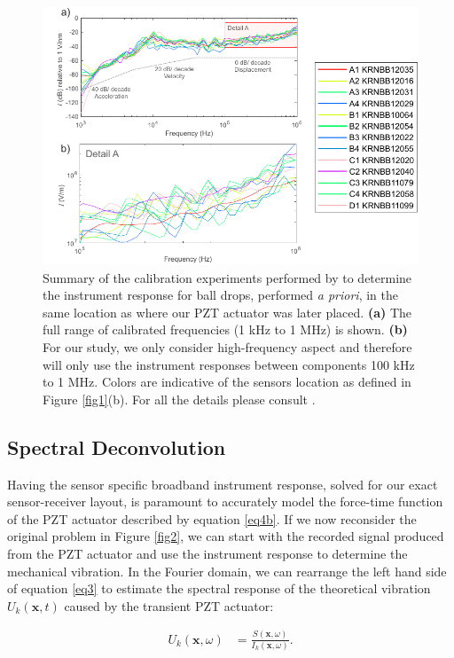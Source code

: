 \documentclass[preprint,3p, 11pt,authoryear]{elsarticle}
\begin{document}
\begin{figure}[ht]
     	\centering
\includegraphics[scale= 1.0]{FIG6.pdf} 
\caption{Summary of the calibration experiments performed by \citet{Wu} to determine the instrument response for ball drops, performed \textit{a priori}, in the same location as where our PZT actuator was later placed. \textbf{(a)} The full range of calibrated frequencies (1 kHz to 1 MHz) is shown. \textbf{(b)} For our study, we only consider high-frequency aspect and therefore will only use the instrument responses between components 100 kHz to 1 MHz.  Colors are indicative of the sensors location as defined in Figure \ref{fig1}(b). For all the details please consult \citet{Wu}. }
	\label{fig6} 
\end{figure}

\subsection{Spectral Deconvolution}
\label{Spec_deconv}
Having the sensor specific broadband instrument response, solved for our exact sensor-receiver layout, is paramount to accurately model the force-time function of the PZT actuator described by equation \eqref{eq4b}.   If we now reconsider the original problem in Figure \ref{fig2}, we can start with the recorded signal produced from the PZT actuator and use the instrument response to determine the mechanical vibration.  In the Fourier domain, we can rearrange the left hand side of equation \eqref{eq3} to estimate the spectral response of the theoretical vibration $U_{k}(\mathbf{x},t)$ caused by the transient PZT actuator:

\begin{equation}
    \label{eq6}
\begin{split}
U_{k}\left( \mathbf{x}, \omega \right) & = 
        \frac{S\left( \mathbf{x}, \omega \right) }{ I_{k}\left( \mathbf{x},\omega \right)}.
\end{split}
\end{equation}
\end{document}
